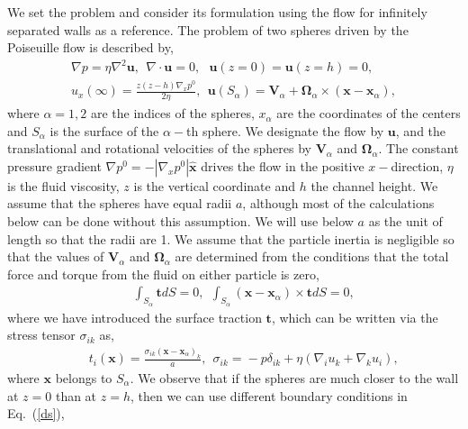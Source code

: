 We set the problem and consider its formulation using the flow for infinitely separated walls as a reference.
The problem of two spheres driven by the Poiseuille flow is described by,
\begin{equation}
  \begin{aligned}
\nabla p\!=\!\eta\nabla^2\bm u,\ \ \nabla \cdot \bm u\!=\!0, \ \ \  \bm u(z\!=\!0)\!=\!\bm u(z\!=\!h)\!=\!0,\ \ \\  %
u_x(\infty)\!=\!\frac{z(z\!-\!h)\nabla_x p^0}{2\eta},\ \ \bm u(S_{\alpha})\!=\!\bm V_{\alpha}\!+\!\bm \Omega_{\alpha}\!\times\! (\bm x\!-\!\bm x_{\alpha}),
\end{aligned}
\label{ds}
\end{equation}
where $\alpha=1, 2$ are the indices of the spheres, $x_{\alpha}$ are the coordinates of the centers and $S_{\alpha}$ is the surface of the $\alpha-$th sphere. We designate the flow by $\bm u$, and the translational and rotational velocities of the spheres by $\bm V_{\alpha}$ and $\bm \Omega_{\alpha}$. The constant pressure gradient $\nabla p^0=-|\nabla_x p^0| \bm{\hat x}$ drives the flow in the positive $x-$direction, $\eta$ is the fluid viscosity, $z$ is the vertical coordinate and $h$ the channel height. We assume that the spheres have equal radii $a$, although most of the calculations below can be done without this assumption.
We will use below $a$ as the unit of length so that the radii are 1.
We assume that the particle inertia is negligible so that the values of $\bm V_{\alpha}$ and $\bm \Omega_{\alpha}$ are determined from the conditions that the total force and torque from the fluid on either particle is zero,
\begin{eqnarray}&&\!\!\!\!\!\!\!\!\!\!\!\!\!
\int_{S_{\alpha}} \bm t  dS=0,\ \ \int_{S_{\alpha}} (\bm x-\bm x_{\alpha})\times \bm t  dS=0, \label{inertless}
\end{eqnarray}
where we have introduced the surface traction $\bm t$, which can be written via the stress tensor $\sigma_{ik}$ as,
\begin{eqnarray}&&\!\!\!\!\!\!\!\!\!\!\!\!\!
t_i(\bm x)\!=\!\frac{\sigma_{ik}(\bm x\!-\!\bm x_{\alpha})_k}{a},\ \ \sigma_{ik}\!=\!-p\delta_{ik}\!+\!\eta(\nabla_iu_k\!+\!\nabla_ku_i),
\end{eqnarray}
where $\bm x$ belongs to $S_{\alpha}$. We observe that if the spheres are much closer to the wall at $z=0$ than at $z=h$, then we can use different boundary conditions in Eq.~(\ref{ds}),

